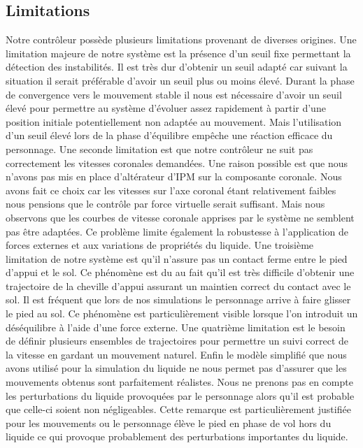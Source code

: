 \documentclass[runningheads,a4paper]{llncs}
\begin{document}
\subsection{Limitations}
Notre contrôleur possède plusieurs limitations provenant de diverses origines. 
Une limitation majeure de notre système est la présence d'un seuil fixe permettant la détection des instabilités. Il est très dur d'obtenir un seuil adapté car suivant la situation il serait préférable d'avoir un seuil plus ou moins élevé. Durant la phase de convergence vers le mouvement stable il nous est nécessaire d'avoir un seuil élevé pour permettre au système d'évoluer assez rapidement à partir d'une position initiale potentiellement non adaptée au mouvement. Mais l'utilisation d'un seuil élevé lors de la phase d'équilibre empêche  une réaction efficace du personnage. 
Une seconde limitation est que notre contrôleur ne suit pas correctement les vitesses coronales demandées. Une raison possible est que nous n'avons pas mis en place d'altérateur d'IPM sur la composante coronale. Nous avons fait ce choix car les vitesses sur l'axe coronal étant relativement faibles nous pensions que le contrôle par force virtuelle serait suffisant. Mais nous observons que les courbes de vitesse coronale apprises par le système ne semblent pas être adaptées. Ce problème limite également la robustesse à l'application de forces externes et aux variations de propriétés du liquide. 
Une troisième limitation de notre système est qu'il n'assure pas un contact ferme entre le pied d'appui et le sol. Ce phénomène est du au fait qu'il est très difficile d'obtenir une trajectoire de la cheville d'appui assurant un maintien correct du contact avec le sol. Il est fréquent que lors de nos simulations le personnage arrive à faire glisser le pied au sol. Ce phénomène est particulièrement visible lorsque l'on introduit un déséquilibre à l'aide d'une force externe. 
Une quatrième limitation est le besoin de définir plusieurs ensembles de trajectoires pour permettre un suivi correct de la vitesse en gardant un mouvement naturel. 
Enfin le modèle simplifié que nous avons utilisé pour la simulation du liquide ne nous permet pas d'assurer que les mouvements obtenus sont parfaitement réalistes. Nous ne prenons pas en compte les perturbations du liquide provoquées par le personnage alors qu'il est probable que celle-ci soient non négligeables. Cette remarque est particulièrement justifiée pour les mouvements ou le personnage élève le pied en phase de vol hors du liquide ce qui provoque probablement des perturbations importantes du liquide.
\end{document}
